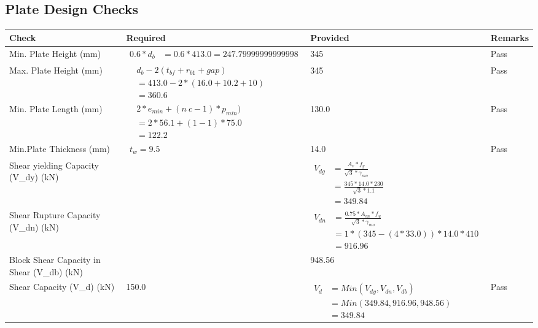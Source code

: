 \documentclass{article}%
\begin{document}
\subsection{Plate Design Checks}%
\label{subsec:PlateDesignChecks}%
\renewcommand{\arraystretch}{1.2}%
\begin{longtable}{|p{4cm}|p{5cm}|p{5.5cm}|p{1.5cm}|}%
\hline%
\rowcolor{OsdagGreen}%
Check&Required&Provided&Remarks\\%
\hline%
\endhead%
\hline%
Min. Plate Height (mm)&$\begin{aligned}0.6 * d_b&= 0.6 * 413.0=247.79999999999998\end{aligned}$&345&Pass\\%
\hline%
Max. Plate Height (mm)&$\begin{aligned} &d_b - 2 (t_{bf} + r_{b1} + gap)\\ &=413.0- 2* (16.0+10.2+ 10)\\ &=360.6\end{aligned}$&345&Pass\\%
\hline%
Min. Plate Length (mm)&$\begin{aligned} &2*e_{min} + (n~c-1) * p_{min})\\ &=2*56.1+(1-1) * 75.0\\ &=122.2\end{aligned}$&130.0&Pass\\%
\hline%
Min.Plate Thickness (mm)&$\begin{aligned} t_w=9.5\end{aligned}$&14.0&Pass\\%
\hline%
Shear yielding Capacity (V\_dy) (kN)&&$\begin{aligned} V_{dg} &= \frac{A_v*f_y}{\sqrt{3}*\gamma_{mo}}\\ &=\frac{345*14.0*230}{\sqrt{3}*1.1}\\ &=349.84\end{aligned}$&\\%
\hline%
Shear Rupture Capacity (V\_dn) (kN)&&$\begin{aligned} V_{dn} &= \frac{0.75*A_{vn}*f_u}{\sqrt{3}*\gamma_{mo}}\\ &=1*(345-(4*33.0))*14.0*410\\ &=916.96\end{aligned}$&\\%
\hline%
Block Shear Capacity in Shear (V\_db) (kN)&&948.56&\\%
\hline%
Shear Capacity (V\_d) (kN)&150.0&$\begin{aligned} V_d &= Min(V_{dy},V_{dn},V_{db})\\ &= Min(349.84,916.96,948.56)\\ &=349.84\end{aligned}$&Pass\\%

\end{longtable}
\end{document}
